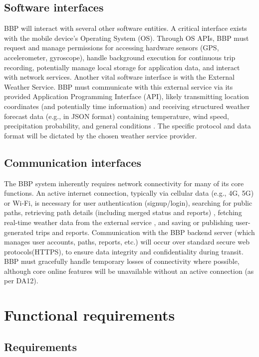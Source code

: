 \subsection{Software interfaces}
\label{subsec:software_interfaces}%
BBP will interact with several other software entities. A critical interface exists with the mobile device's Operating System (OS). Through OS APIs, BBP must request and manage permissions for accessing hardware sensors (GPS, accelerometer, gyroscope), handle background execution for continuous trip recording, potentially manage local storage for application data, and interact with network services. Another vital software interface is with the External Weather Service. BBP must communicate with this external service via its provided Application Programming Interface (API), likely transmitting location coordinates (and potentially time information) and receiving structured weather forecast data (e.g., in JSON format) containing temperature, wind speed, precipitation probability, and general conditions . The specific protocol and data format will be dictated by the chosen weather service provider. 

\subsection{Communication interfaces}
\label{subsec:communication_interfaces}%

The BBP system inherently requires network connectivity for many of its core functions. An active internet connection, typically via cellular data (e.g., 4G, 5G) or Wi-Fi, is necessary for user authentication (signup/login), searching for public paths, retrieving path details (including merged status and reports) , fetching real-time weather data from the external service , and saving or publishing user-generated trips and reports. Communication with the BBP backend server (which manages user accounts, paths, reports, etc.) will occur over standard secure web protocols(HTTPS), to ensure data integrity and confidentiality during transit. BBP must gracefully handle temporary losses of connectivity where possible, although core online features will be unavailable without an active connection (as per DA12).
\section{Functional requirements}
\label{sec:functional_requirements}%

\subsection{Requirements}
\label{subsec:requirements3}%
\renewcommand{\thereqcounter}{R\arabic{reqcounter}} %

